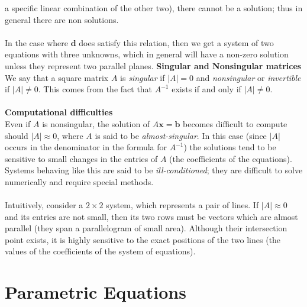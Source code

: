 \documentclass{report}
\begin{document}
a specific linear combination of the other two), there cannot be a solution; thus in general 
there are non solutions.\\
\vspace{1mm}\\
In the case where $\mathbf{d}$ does satisfy this relation, then we get a system of 
two equations with three unknowns, which in general will have a non-zero solution 
unless they represent two parallel planes.
\newpage
\noindent\textbf{Singular and Nonsingular matrices}\\
We say that a square matrix $A$ is \textit{singular} if $|A|=0$ and \textit{nonsingular} 
or \textit{invertible} if $|A|\neq0$. This comes from the fact that $A^{-1}$ exists
if and only if $|A|\neq0$.\\
\vspace{1mm}\\
\textbf{Computational difficulties}\\
Even if $A$ is nonsingular, the solution of $A\mathbf{x=b}$ becomes difficult to 
compute should $|A|\approx0$, where $A$ is said to be \textit{almost-singular}. 
In this case (since $|A|$ occurs in the denominator in the formula for
$A^{-1}$) the solutions tend to be sensitive to small changes in the entries of $A$ 
(the coefficients of the equations). 
Systems behaving like this are said to be \textit{ill-conditioned}; they are difficult 
to solve numerically and require special methods.\\
\vspace{1mm}\\
Intuitively, consider a $2\times2$ system, which represents a pair of lines. 
If $|A|\approx0$ and its entries are not small, then its two rows must be vectors which
are almost parallel (they span a parallelogram of small area). 
Although their intersection point exists, it is highly sensitive to the exact positions of the 
two lines (the values of the coefficients of the system of equations).
\newpage


\section{Parametric Equations} 
\end{document}
